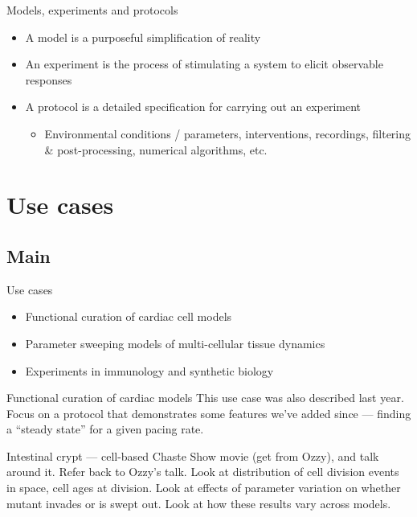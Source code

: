 \documentclass[t,xcolor={usenames,dvipsnames}]{beamer}
\newcommand{\subitem}[1]{\begin{itemize}[<.->]\item #1 \end{itemize}}
\begin{document}
\begin{frame}{Models, experiments and protocols}
\begin{itemize}
\item A \alert{model} is a purposeful simplification of reality
\item An \alert{experiment} is the process of stimulating a system to elicit observable responses
\item A \alert{protocol} is a detailed specification for carrying out an experiment
  \subitem{Environmental conditions / parameters, interventions, recordings, filtering \& post-processing, numerical algorithms, etc.}
\end{itemize}
\end{frame}


\section[Use cases]{Use cases}
\subsection*{Main}

\begin{frame}{Use cases}
\begin{itemize}
\item Functional curation of cardiac cell models
\item Parameter sweeping models of multi-cellular tissue dynamics
\item Experiments in immunology and synthetic biology
\end{itemize}
\end{frame}


\begin{frame}{Functional curation of cardiac models}
This use case was also described last year.
Focus on a protocol that demonstrates some features we've added since --- finding a ``steady state'' for a given pacing rate.
\end{frame}


\begin{frame}{Intestinal crypt --- cell-based Chaste}
Show movie (get from Ozzy), and talk around it.
Refer back to Ozzy's talk.
Look at distribution of cell division events in space, cell ages at division.
Look at effects of parameter variation on whether mutant invades or is swept out.
Look at how these results vary across models.
\end{frame}
\end{document}
